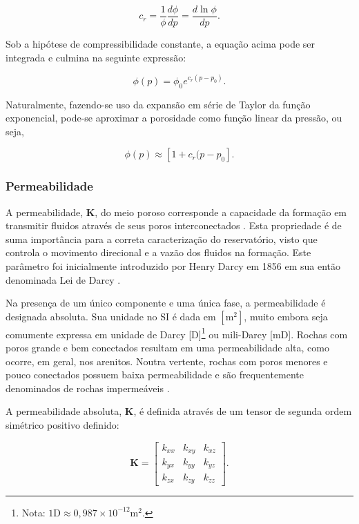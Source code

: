 \begin{equation}
	c_{r} = \frac{1}{\phi}\frac{d \phi}{dp} = \dfrac{d\ln{\phi}}{dp}.
\end{equation}

Sob a hipótese de compressibilidade constante, a equação acima pode ser integrada e culmina na seguinte expressão:

\begin{equation}
	\phi(p) = \phi_{0}e^{c_{r}(p-p_{0})}.
\end{equation}

Naturalmente, fazendo-se uso da expansão em série de Taylor da função exponencial, pode-se aproximar a porosidade como função linear da pressão, ou seja, 

\begin{equation}
	\phi(p) \approx [1+c_{r}(p-p_{0}].
\end{equation}

\subsubsection{Permeabilidade}

A permeabilidade, $\mathbf{K}$, do meio poroso corresponde a capacidade da formação em transmitir fluidos através de seus poros interconectados \cite{Chen2006,Sousa2023}. Esta propriedade é de suma importância para a correta caracterização do reservatório, visto que controla o movimento direcional e a vazão dos fluidos na formação. Este parâmetro foi inicialmente introduzido por Henry Darcy em 1856 em sua então denominada Lei de Darcy \cite{Ahmed2010}. 

Na presença de um único componente e uma única fase, a permeabilidade é designada absoluta. Sua unidade no SI é dada em $[\text{m}^{2}]$, muito embora seja comumente expressa em unidade de Darcy [D]\footnote{Nota: $1\text{D} \approx 0,987 \times 10^{-12}\text{m}^{2}$.} ou mili-Darcy [mD]. Rochas com poros grande e bem conectados resultam em uma permeabilidade alta, como ocorre, em geral, nos arenitos. Noutra vertente, rochas com poros menores e pouco conectados possuem baixa permeabilidade e são frequentemente denominados de rochas impermeáveis \cite{Sousa2023}. 

A permeabilidade absoluta, $\mathbf{K}$, é definida através de um tensor de segunda ordem simétrico positivo definido:

\begin{equation}
	\mathbf{K} = \begin{bmatrix}
		k_{xx} & k_{xy} & k_{xz} \\
		k_{yx} & k_{yy} & k_{yz} \\
		k_{zx} & k_{zy} & k_{zz}
	\end{bmatrix}.
\end{equation}

